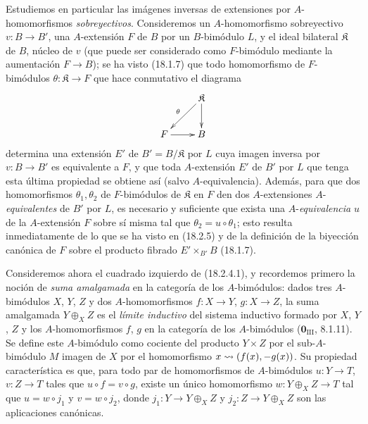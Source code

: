\begin{env}[18.2.6]
\label{0.18.2.6-fr}
Estudiemos en particular las imágenes inversas de extensiones por
$A$-homomorfismos \emph{sobreyectivos}. Consideremos un $A$-homomorfismo
sobreyectivo $v:B\to B'$, una $A$-extensión $F$ de $B$ por un $B$-bimódulo $L$,
y el ideal bilateral $\mathfrak{K}$ de $B$, núcleo de $v$ (que puede ser
considerado como $F$-bimódulo mediante la aumentación $F\to B$); se ha visto
(18.1.7) que todo homomorfismo de $F$-bimódulos
$\theta:\mathfrak{K}\to F$ que hace conmutativo el diagrama
\[
  \xymatrix{
    & \mathfrak{K}\ar[ld]_\theta\ar[d]\\
    F\ar[r] & B
  }
\]
determina una extensión $E'$ de $B'=B/\mathfrak{K}$ por $L$ cuya imagen
inversa por $v:B\to B'$ es equivalente a $F$, y que toda $A$-extensión
$E'$ de $B'$ por $L$ que tenga esta última propiedad se obtiene así (salvo
$A$-equivalencia). Además, para que dos homomorfismos
$\theta_1,\theta_2$ de $F$-bimódulos de $\mathfrak{K}$ en $F$ den dos
  $A$-extensiones $A$-\emph{equivalentes} de $B'$ por $L$, es necesario y suficiente que
exista una $A$-\emph{equivalencia} $u$ de la $A$-extensión $F$ sobre sí misma tal que
$\theta_2=u\circ\theta_1$; esto resulta inmediatamente de lo que se ha visto en
(18.2.5) y de la definición de la biyección canónica de $F$ sobre el producto
fibrado $E'\times_{B'}B$ (18.1.7).
\end{env}

\begin{env}[18.2.7]
\label{0.18.2.7-fr}
Consideremos ahora el cuadrado izquierdo de (18.2.4.1), y recordemos primero
la noción de \emph{suma amalgamada} en la categoría de los $A$-bimódulos:
dados tres $A$-bimódulos $X$, $Y$, $Z$ y dos $A$-homomorfismos
$f:X\to Y$, $g:X\to Z$, la suma amalgamada $Y\oplus_XZ$ es el \emph{límite
inductivo} del sistema inductivo formado por $X$, $Y$, $Z$ y los
$A$-homomorfismos $f$, $g$ en la categoría de los $A$-bimódulos
($\mathbf{0}_{\mathrm{III}}$, 8.1.11). Se define este $A$-bimódulo como cociente del
producto $Y\times Z$ por el sub-$A$-bimódulo $M$ imagen de $X$ por
el homomorfismo $x\leadsto(f(x),- g(x))$. Su propiedad característica es que,
para todo par de homomorfismos de $A$-bimódulos $u:Y\to T$, $v:Z\to T$
tales que $u\circ f=v\circ g$, existe un único homomorfismo
$w:Y\oplus_XZ\to T$ tal que $u=w\circ j_1$ y $v=w\circ j_2$, donde
$j_1:Y\to Y\oplus_XZ$ y $j_2:Z\to Y\oplus_XZ$ son las aplicaciones
canónicas.
\end{env}

